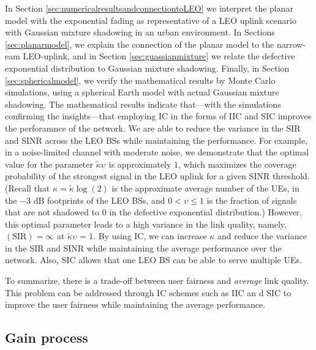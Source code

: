 \documentclass[lettersize,journal]{IEEEtran}
\begin{document}
In Section \ref{sec:numericalresultsandconnectiontoLEO} we interpret the planar model with the exponential fading as representative of a LEO uplink scenario with Gaussian mixture shadowing in an urban environment. In Sections \ref{sec:planarmodel}, we explain the connection of the planar model to the narrow-eam LEO-uplink, and in Section \ref{sec:guassianmixture} we relate the defective exponential distribution to Gaussian mixture shadowing. Finally, in Section \ref{sec:sphericalmodel}, we verify the mathematical results by Monte Carlo simulations, using a spherical Earth model with actual Gaussian mixture shadowing. The mathematical results indicate that---with the simulations confirming the insights---that employing IC in the forms of IIC and SIC improves the perforamnce of the network. We are able to reduce the variance in the SIR and SINR across the LEO BSs while maintaining the performance. For example, in a noise-limited channel with moderate noise, we demonstrate that the optimal value for the parameter $\tilde{\kappa} \upsilon_{}$ is approximately $1$, which maximizes the coverage probability of the strongest signal in the LEO uplink for a given SINR threshold. (Recall that $\kappa=\tilde{\kappa} \log(2)$ is the approximate average number of the UEs, in the $-3$ dB footprints of the LEO BSs, and $0<\upsilon \leq 1$ is the fraction of signals that are not shadowed to $0$ in the defective exponential distribution.) However, this optimal parameter leads to a high variance in the link quality, namely, $(\text{SIR})=\infty$ at $\tilde{\kappa} \upsilon_{}=1$. By using IC, we can increase $\kappa$ and reduce the variance in the SIR and SINR while maintaining the average performance over the network. Also, SIC allows that one LEO BS can be able to serve multiple UEs.

To summarize, there is a trade-off between user fairness and \textit{average} link quality. This problem can be addressed through IC schemes such as IIC an
d SIC to improve the user fairness while maintaining the average performance.




\subsection{Gain process}
\label{sec:gainprocess}
\end{document}
